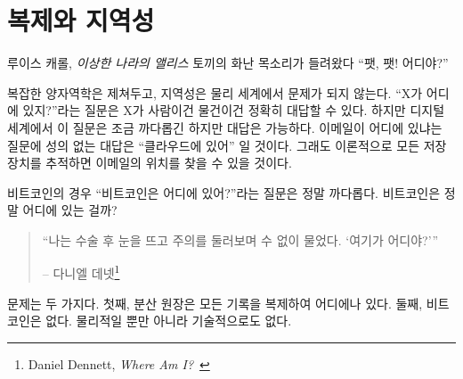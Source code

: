 \chapter{복제와 지역성}
\label{les:3}

\begin{chapquote}{루이스 캐롤, \textit{이상한 나라의 앨리스}}
	토끼의 화난 목소리가 들려왔다 \enquote{팻, 팻! 어디야?}
\end{chapquote}

복잡한 양자역학은 제쳐두고, 지역성은 물리 세계에서 문제가 되지 않는다. \enquote{X가 어디에 있지?}라는 
질문은 X가 사람이건 물건이건 정확히 대답할 수 있다. 하지만 디지털 세계에서 이 질문은 
조금 까다롭긴 하지만 대답은 가능하다. 이메일이 어디에 있냐는 질문에 성의 없는 대답은 \enquote{클라우드에 있어} 일 것이다.
그래도 이론적으로 모든 저장장치를 추적하면 이메일의 위치를 찾을 수 있을 것이다.

비트코인의 경우 \enquote{비트코인은 어디에 있어?}라는 질문은 정말 까다롭다. 비트코인은 정말 어디에 있는 걸까?

\begin{quotation}\begin{samepage}
		\enquote{나는 수술 후 눈을 뜨고 주의를 둘러보며 수 없이 물었다. `여기가 어디야?'}
		\begin{flushright} -- 다니엘 데넷\footnote{Daniel Dennett, \textit{Where Am I?}~\cite{where-am-i}}
\end{flushright}\end{samepage}\end{quotation}

문제는 두 가지다. 첫째, 분산 원장은 모든 기록을 복제하여 어디에나 있다. 둘째, 비트코인은 없다. 
물리적일 뿐만 아니라 기술적으로도 없다.

